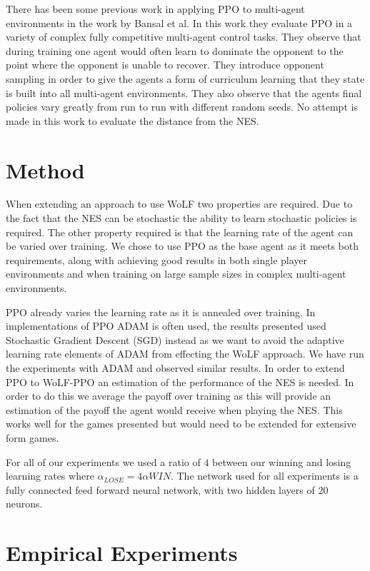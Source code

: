 \documentclass[conference]{IEEEtran}
\begin{document}
There has been some previous work in applying PPO to multi-agent environments in the work by Bansal et al\cite{bansal2017emergent}. In this work they evaluate PPO in a variety of complex fully competitive multi-agent control tasks. They observe that during training one agent would often learn to dominate the opponent to the point where the opponent is unable to recover. They introduce opponent sampling in order to give the agents a form of curriculum learning that they state is built into all multi-agent environments. They also observe that the agents final policies vary greatly from run to run with different random seeds. No attempt is made in this work to evaluate the distance from the NES.

\section{Method}

When extending an approach to use WoLF two properties are required. Due to the fact that the NES can be stochastic the ability to learn stochastic policies is required. The other property required is that the learning rate of the agent can be varied over training. We chose to use PPO as the base agent as it meets both requirements, along with achieving good results in both single player environments and when training on large sample sizes in complex multi-agent environments\cite{OpenAI_dota}. 

PPO already varies the learning rate as it is annealed over training. In implementations of PPO ADAM is often used, the results presented used Stochastic Gradient Descent (SGD) instead as we want to avoid the adaptive learning rate elements of ADAM from effecting the WoLF approach. We have run the experiments with ADAM and observed similar results. In order to extend PPO to WoLF-PPO an estimation of the performance of the NES is needed. In order to do this we average the payoff over training as this will provide an estimation of the payoff the agent would receive when playing the NES. This works well for the games presented but would need to be extended for extensive form games.

For all of our experiments we used a ratio of $4$ between our winning and losing learning rates where $\alpha_{LOSE} = 4\alpha{WIN}$. The network used for all experiments is a fully connected feed forward neural network, with two hidden layers of $20$ neurons.

\section{Empirical Experiments}
\end{document}
